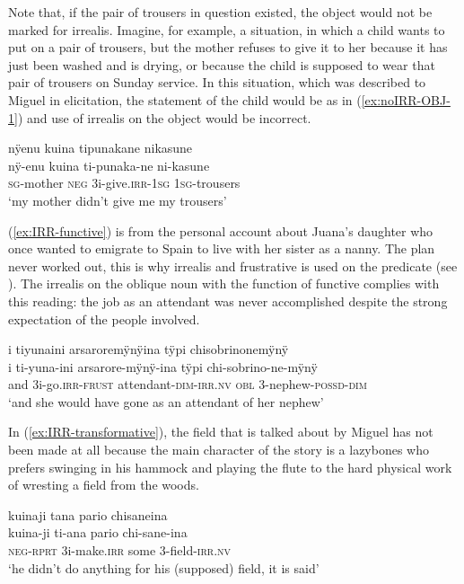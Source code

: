 Note that, if the pair of trousers in question existed, the object would not be marked for irrealis. Imagine, for example, a situation, in which a child wants to put on a pair of trousers, but the mother refuses to give it to her because it has just been washed and is drying, or because the child is supposed to wear that pair of trousers on Sunday service. In this situation, which was described to Miguel in elicitation, the statement of the child would be as in (\ref{ex:noIRR-OBJ-1}) and use of irrealis on the object would be incorrect.

\ea\label{ex:noIRR-OBJ-1}
\begingl 
\glpreamble nÿenu kuina tipunakane nikasune\\
\gla nÿ-enu kuina ti-punaka-ne ni-kasune\\ 
\textsc{sg}-mother \textsc{neg} 3i-give.\textsc{irr}-1\textsc{sg} 1\textsc{sg}-trousers\\ 
\glft ‘my mother didn't give me my trousers’
\trailingcitation{[mxx-e160811sd.039]}
\xe

(\ref{ex:IRR-functive}) is from the personal account about Juana’s daughter who once wanted to emigrate to Spain to live with her sister as a nanny. The plan never worked out, this is why irrealis and frustrative is used on the predicate (see ). The irrealis on the oblique noun with the function of functive \citep[cf.][]{Creissels2014} complies with this reading: the job as an attendant was never accomplished despite the strong expectation of the people involved.

\ea\label{ex:IRR-functive}
\begingl 
\glpreamble i tiyunaini arsaroremÿnÿina tÿpi chisobrinonemÿnÿ\\
\gla i ti-yuna-ini arsarore-mÿnÿ-ina tÿpi chi-sobrino-ne-mÿnÿ\\ 
\glb and 3i-go.\textsc{irr}-\textsc{frust} attendant-\textsc{dim}-\textsc{irr.nv} \textsc{obl} 3-nephew-\textsc{possd}-\textsc{dim}\\ 
\glft ‘and she would have gone as an attendant of her nephew’
\trailingcitation{[jxx-p120430l-1.188]}
\xe

In (\ref{ex:IRR-transformative}), the field that is talked about by Miguel has not been made at all because the main character of the story is a lazybones who prefers swinging in his hammock and playing the flute to the hard physical work of wresting a field from the woods.

\ea\label{ex:IRR-transformative}
\begingl 
\glpreamble kuinaji tana pario chisaneina\\
\gla kuina-ji ti-ana pario chi-sane-ina\\ 
\glb \textsc{neg}-\textsc{rprt} 3i-make.\textsc{irr} some 3-field-\textsc{irr.nv}\\ 
\glft ‘he didn't do anything for his (supposed) field, it is said’
\trailingcitation{[mox-n110920l.012]}
\xe


